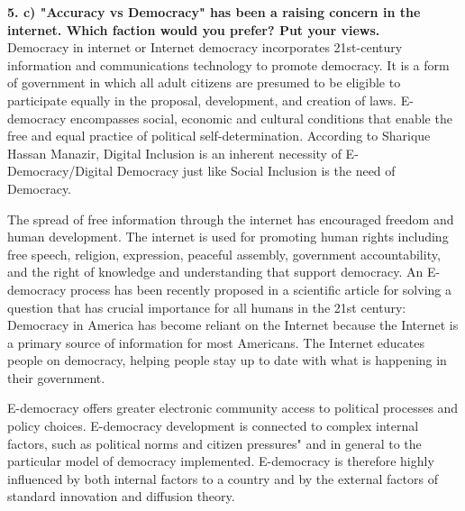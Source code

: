 \documentclass [12pt, a4paper]{article}
\begin{document}
\large
\textbf{5. c) "Accuracy vs Democracy" has been a raising concern in the internet. Which faction would you prefer? Put your views.}\\
\normalsize
Democracy in internet or Internet democracy incorporates 21st-century information and communications technology to promote democracy. It is a form of government in which all adult citizens are presumed to be eligible to participate equally in the proposal, development, and creation of laws.  E-democracy encompasses social, economic and cultural conditions that enable the free and equal practice of political self-determination. According to Sharique Hassan Manazir, Digital Inclusion  is an inherent necessity of E-Democracy/Digital Democracy just like Social Inclusion is the need of Democracy. \\
\par
The spread of free information through the internet has encouraged freedom and human development. The internet is used for promoting human rights including free speech, religion, expression, peaceful assembly, government accountability, and the right of knowledge and understanding that support democracy. An E-democracy process has been recently proposed in a scientific article for solving a question that has crucial importance for all humans in the 21st century: Democracy in America has become reliant on the Internet because the Internet is a primary source of information for most Americans. The Internet educates people on democracy, helping people stay up to date with what is happening in their government.\\
\par
E-democracy offers greater electronic community access to political processes and policy choices. E-democracy development is connected to complex internal factors, such as political norms and citizen pressures" and in general to the particular model of democracy implemented. E-democracy is therefore highly influenced by both internal factors to a country and by the external factors of standard innovation and diffusion theory.\\
\end{document}
